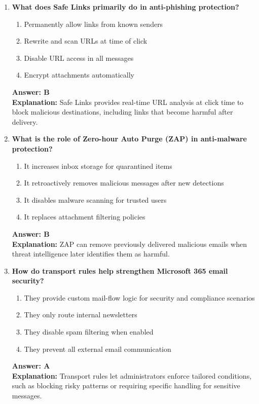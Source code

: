 \documentclass[10pt]{article}
\begin{document}
\begin{enumerate}[leftmargin=*]
\item \textbf{What does Safe Links primarily do in anti-phishing protection?}
\begin{enumerate}[label=\Alph*.]
  \item Permanently allow links from known senders
  \item Rewrite and scan URLs at time of click
  \item Disable URL access in all messages
  \item Encrypt attachments automatically
\end{enumerate}
\textbf{Answer: B}\\
\textbf{Explanation:} Safe Links provides real-time URL analysis at click time to block malicious destinations, including links that become harmful after delivery.

\item \textbf{What is the role of Zero-hour Auto Purge (ZAP) in anti-malware protection?}
\begin{enumerate}[label=\Alph*.]
  \item It increases inbox storage for quarantined items
  \item It retroactively removes malicious messages after new detections
  \item It disables malware scanning for trusted users
  \item It replaces attachment filtering policies
\end{enumerate}
\textbf{Answer: B}\\
\textbf{Explanation:} ZAP can remove previously delivered malicious emails when threat intelligence later identifies them as harmful.

\item \textbf{How do transport rules help strengthen Microsoft 365 email security?}
\begin{enumerate}[label=\Alph*.]
  \item They provide custom mail-flow logic for security and compliance scenarios
  \item They only route internal newsletters
  \item They disable spam filtering when enabled
  \item They prevent all external email communication
\end{enumerate}
\textbf{Answer: A}\\
\textbf{Explanation:} Transport rules let administrators enforce tailored conditions, such as blocking risky patterns or requiring specific handling for sensitive messages.


\end{enumerate}
\end{document}
